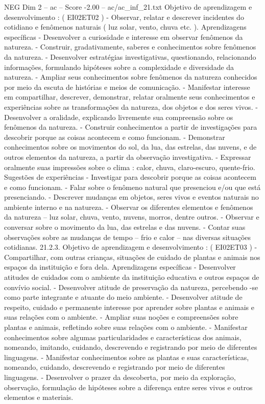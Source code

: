 \begin{textsample}{NEG Dim 2 – ac – Score -2.00 – ac/ac\_inf\_21.txt}
Objetivo de aprendizagem e desenvolvimento : ( EI02ET02 ) - Observar, relatar e descrever incidentes do cotidiano e fenômenos naturais ( luz solar, vento, chuva etc. ).
Aprendizagens específicas - Desenvolver a curiosidade e interesse em observar fenômenos da natureza. - Construir, gradativamente, saberes e conhecimentos sobre fenômenos da natureza. - Desenvolver estratégias investigativas, questionando, relacionando informações, formulando hipóteses sobre a complexidade e diversidade da natureza. - Ampliar seus conhecimentos sobre fenômenos da natureza conhecidos por meio da escuta de histórias e meios de comunicação. - Manifestar interesse em compartilhar, descrever, demonstrar, relatar oralmente seus conhecimentos e experiências sobre as transformações da natureza, dos objetos e dos seres vivos. - Desenvolver a oralidade, explicando livremente sua compreensão sobre os fenômenos da natureza. - Construir conhecimentos a partir de investigações para descobrir porque as coisas acontecem e como funcionam. - Demonstrar conhecimentos sobre os movimentos do sol, da lua, das estrelas, das nuvens, e de outros elementos da natureza, a partir da observação investigativa. - Expressar oralmente suas impressões sobre o clima : calor, chuva, claro-escuro, quente-frio.
Sugestões de experiências - Investigar para descobrir porque as coisas acontecem e como funcionam. - Falar sobre o fenômeno natural que presenciou e/ou que está presenciando. - Descrever mudanças em objetos, seres vivos e eventos naturais no ambiente interno e na natureza. - Observar os diferentes elementos e fenômenos da natureza – luz solar, chuva, vento, nuvens, morros, dentre outros. - Observar e conversar sobre o movimento da lua, das estrelas e das nuvens. - Contar suas observações sobre as mudanças de tempo – frio e calor – nas diversas situações cotidianas. 21.2.3.
Objetivo de aprendizagem e desenvolvimento : ( EI02ET03 ) - Compartilhar, com outras crianças, situações de cuidado de plantas e animais nos espaços da instituição e fora dela.
Aprendizagens específicas - Desenvolver atitudes de cuidados com o ambiente da instituição educativa e outros espaços de convívio social. - Desenvolver atitude de preservação da natureza, percebendo -se como parte integrante e atuante do meio ambiente. - Desenvolver atitude de respeito, cuidado e permanente interesse por aprender sobre plantas e animais e suas relações com o ambiente. - Ampliar suas noções e compreensões sobre plantas e animais, refletindo sobre suas relações com o ambiente. - Manifestar conhecimentos sobre algumas particularidades e características dos animais, nomeando, imitando, cuidando, descrevendo e registrando por meio de diferentes linguagens. - Manifestar conhecimentos sobre as plantas e suas características, nomeando, cuidando, descrevendo e registrando por meio de diferentes linguagens. - Desenvolver o prazer da descoberta, por meio da exploração, observação, formulação de hipóteses sobre a diferença entre seres vivos e outros elementos e materiais.

\end{textsample}
